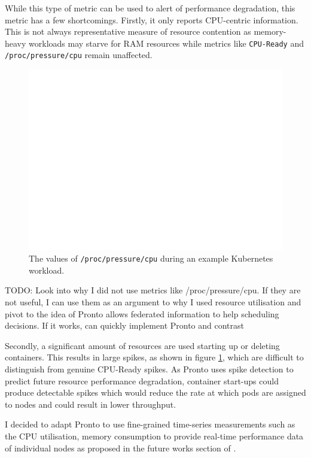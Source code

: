 While this type of metric can be used to alert of performance degradation,
this metric has a few shortcomings. Firstly, it only reports CPU-centric
information. This is not always representative measure of resource
contention as memory-heavy workloads may starve for RAM resources while
metrics like \verb|CPU-Ready| and \verb|/proc/pressure/cpu| remain
unaffected.
\begin{figure}[h]
    \centering
    \includegraphics[width=\textwidth]{images/blank.pdf}
    \caption{The values of \texttt{/proc/pressure/cpu} during an example Kubernetes workload.}
    \label{pressure-eval}
\end{figure}
TODO: Look into why I did not use metrics like /proc/pressure/cpu. If they
are not useful, I can use them as an argument to why I used resource
utilisation and pivot to the idea of Pronto allows federated information to
help scheduling decisions. If it works, can quickly implement Pronto and
contrast

Secondly, a significant amount of resources are used starting up or deleting
containers. This results in large spikes, as shown in figure
\ref{pressure-eval}, which are difficult to distinguish from genuine CPU-Ready
spikes. As Pronto uses spike detection to predict future resource performance
degradation, container start-ups could produce detectable spikes which would
reduce the rate at which pods are assigned to nodes and could result in lower
throughput.

I decided to adapt Pronto to use fine-grained time-series measurements such as
the CPU utilisation, memory consumption to provide real-time performance data of
individual nodes as proposed in the future works section of
\cite{grammenos_pronto_2021}.

